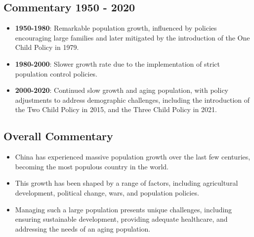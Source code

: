 \subsection*{Commentary 1950 - 2020}
\begin{itemize}
    \item \textbf{1950-1980}: Remarkable population growth, influenced by policies encouraging large families and later mitigated by the introduction of the One Child Policy in 1979.
    \item \textbf{1980-2000}: Slower growth rate due to the implementation of strict population control policies.
    \item \textbf{2000-2020}: Continued slow growth and aging population, with policy adjustments to address demographic challenges, including the introduction of the Two Child Policy in 2015, and the Three Child Policy in 2021.
\end{itemize}

\subsection*{Overall Commentary}
\begin{itemize}
    \item China has experienced massive population growth over the last few centuries, becoming the most populous country in the world.
    \item This growth has been shaped by a range of factors, including agricultural development, political change, wars, and population policies.
    \item Managing such a large population presents unique challenges, including ensuring sustainable development, providing adequate healthcare, and addressing the needs of an aging population.
\end{itemize}